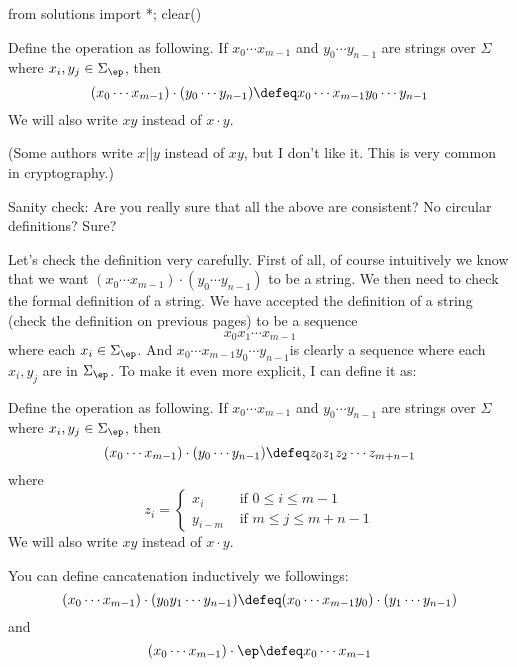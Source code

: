 \begin{python0}
from solutions import *; clear()
\end{python0}

\begin{defn}
  Define the  operation as following. If
  $x_0 \cdots x_{m-1}$ and $y_0 \cdots y_{n-1}$ are strings over $\Sigma$ where
  $x_i,y_j \in \Sigma_\ep$, then
  \[
  (x_0 \cdots x_{m-1}) \cdot (y_0 \cdots y_{n-1})
  \defeq x_0 \cdots x_{m-1} y_0 \cdots y_{n-1}
  \]
  We will also write $xy$ instead of $x\cdot y$.
\end{defn}

(Some authors write $x||y$ instead of $xy$, but I don't like it.
This is very common in cryptography.)

Sanity check: Are you really sure that all the above are
consistent? No circular definitions? Sure?

Let's check the definition very carefully.
First of all, of course intuitively we know that we want 
$(x_0 \cdots x_{m-1}) \cdot (y_0 \cdots y_{n-1})$
to be a string.
We then need to check the formal definition of a string.
We have accepted the definition of a string (check the definition on previous pages) to be a sequence
\[
x_0 x_1 \cdots x_{m-1}
\]
where each $x_i \in \Sigma_\ep$.
And $x_0 \cdots x_{m-1} y_0 \cdots y_{n-1}$is clearly a sequence where each $x_i, y_j$ are in $\Sigma_\ep$.
To make it even more explicit, I can define it as:

\begin{defn}
  Define the  operation as following. If
  $x_0 \cdots x_{m-1}$ and $y_0 \cdots y_{n-1}$ are strings over $\Sigma$ where
  $x_i,y_j \in \Sigma_\ep$, then
  \[
  (x_0 \cdots x_{m-1}) \cdot (y_0 \cdots y_{n-1})
  \defeq z_0 z_1 z_2 \cdots z_{m + n - 1}
  \]
  where
  \[
  z_i =
  \begin{cases}
    x_i & \text{ if $0 \leq i \leq m - 1$} \\
    y_{i - m} & \text{ if $m \leq j \leq m + n - 1$}
  \end{cases}
  \]
  We will also write $xy$ instead of $x\cdot y$.
\end{defn}

You can define cancatenation inductively we followings:
  \[
  (x_0 \cdots x_{m-1}) \cdot (y_0 y_1 \cdots y_{n - 1})
  \defeq
  (x_0 \cdots x_{m-1} y_0) \cdot (y_1 \cdots y_{n - 1})
  \]
  and
  \[
  (x_0 \cdots x_{m-1}) \cdot \ep
  \defeq
  x_0 \cdots x_{m-1}
  \]


